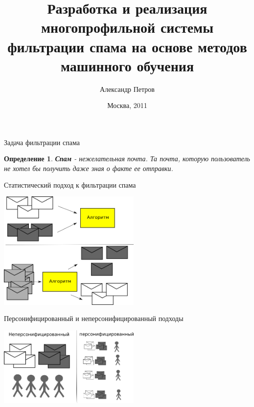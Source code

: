 \documentclass{beamer}
\newtheorem{define}{Определение}
\begin{document}
\title{Разработка и реализация многопрофильной системы фильтрации спама на основе методов машинного обучения}
\author{Александр Петров}
\date{Москва, 2011}
\frame{\titlepage}

\begin{frame}{Задача фильтрации спама}
    \begin{define}
        \textbf{Спам} - нежелательная почта. Та почта, которую пользователь не хотел бы получить даже зная о факте ее отправки.
    \end{define}
\end{frame}

\begin{frame}{Статистический подход к фильтрации спама}
\begin{center}
    \includegraphics[width=7cm]{img/statmethod}
\end{center}
\end{frame}


\begin{frame}{Персонифицированный и неперсонифицированный подходы}
\begin{center}
    \includegraphics[width=7cm]{img/pers_nopers}
\end{center}
\end{frame}
\end{document}
